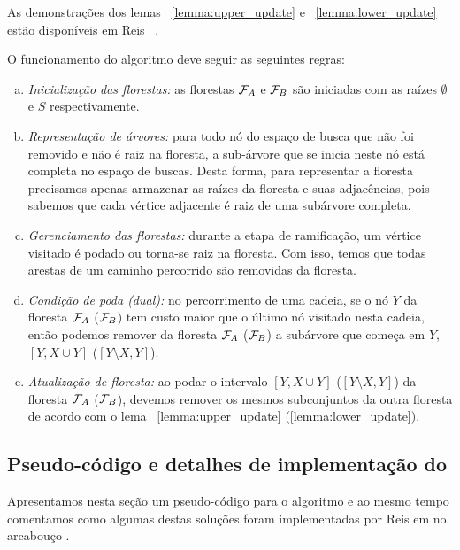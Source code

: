 As demonstrações dos lemas ~\ref{lemma:upper_update} e 
~\ref{lemma:lower_update} estão disponíveis em Reis ~\cite{Rei12}.

O funcionamento do algoritmo deve seguir as seguintes regras:
\begin{enumerate}[a)]
    \item{\it Inicialização das florestas:} as florestas $\mathcal{F}_A$ e 
        $\mathcal{F}_B$ são iniciadas com as raízes $\emptyset$ e $S$ 
        respectivamente. \label{pfs:rule:a}
    \item{\it Representação de árvores:} para todo nó do espaço de busca 
        que não foi removido e não é raiz na floresta, a sub-árvore que
        se inicia neste nó está completa no espaço de buscas. Desta 
        forma, para representar a floresta precisamos apenas armazenar
        as raízes da floresta e suas adjacências, pois sabemos que cada
        vértice adjacente é raiz de uma subárvore completa. 
        \label{pfs:rule:b}
    \item{\it Gerenciamento das florestas:} durante a etapa de 
        ramificação, um vértice visitado é podado ou torna-se raiz na 
        floresta. Com isso, temos que todas arestas de um caminho 
        percorrido são removidas da floresta. \label{pfs:rule:c}
    \item{\it Condição de poda (dual):} no percorrimento de uma cadeia,
        se o nó $Y$ da floresta $\mathcal{F}_A$ ($\mathcal{F}_B$) tem custo 
        maior que o último nó visitado nesta cadeia, então podemos 
        remover da floresta $\mathcal{F}_A$ ($\mathcal{F}_B$) a subárvore que
        começa em $Y$, $[Y, X \cup Y]$ ($[Y \setminus X, Y]$). 
        \label{pfs:rule:d}
    \item{\it Atualização de floresta:} ao podar o intervalo 
        $[Y, X \cup Y]$ ($[Y \setminus X, Y]$) da floresta $\mathcal{F}_A$
        ($\mathcal{F}_B$), devemos remover os mesmos subconjuntos da outra
        floresta de acordo com o lema ~\ref{lemma:upper_update}
        (\ref{lemma:lower_update}). \label{pfs:rule:e}
\end{enumerate}


\subsection{Pseudo-código e detalhes de implementação do }
Apresentamos nesta seção um pseudo-código para o algoritmo e ao mesmo
tempo comentamos como algumas destas soluções foram implementadas por
Reis em  no arcabouço .

